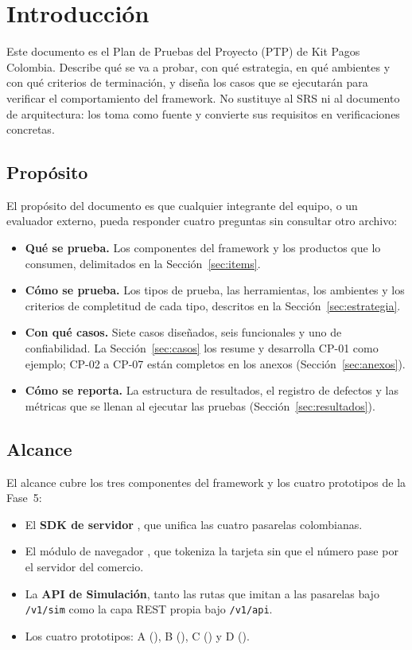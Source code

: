 \section{Introducción}

Este documento es el Plan de Pruebas del Proyecto (PTP) de Kit Pagos Colombia. Describe qué se va a probar, con qué estrategia, en qué ambientes y con qué criterios de terminación, y diseña los casos que se ejecutarán para verificar el comportamiento del framework. No sustituye al SRS ni al documento de arquitectura: los toma como fuente y convierte sus requisitos en verificaciones concretas.

\subsection{Propósito}

El propósito del documento es que cualquier integrante del equipo, o un evaluador externo, pueda responder cuatro preguntas sin consultar otro archivo:

\begin{itemize}
  \item \textbf{Qué se prueba.} Los componentes del framework y los productos que lo consumen, delimitados en la Sección~\ref{sec:items}.
  \item \textbf{Cómo se prueba.} Los tipos de prueba, las herramientas, los ambientes y los criterios de completitud de cada tipo, descritos en la Sección~\ref{sec:estrategia}.
  \item \textbf{Con qué casos.} Siete casos diseñados, seis funcionales y uno de confiabilidad. La Sección~\ref{sec:casos} los resume y desarrolla CP-01 como ejemplo; CP-02 a CP-07 están completos en los anexos (Sección~\ref{sec:anexos}).
  \item \textbf{Cómo se reporta.} La estructura de resultados, el registro de defectos y las métricas que se llenan al ejecutar las pruebas (Sección~\ref{sec:resultados}).
\end{itemize}

\subsection{Alcance}

El alcance cubre los tres componentes del framework y los cuatro prototipos de la Fase~5:

\begin{itemize}
  \item El \textbf{SDK de servidor} , que unifica las cuatro pasarelas colombianas.
  \item El módulo de navegador , que tokeniza la tarjeta sin que el número pase por el servidor del comercio.
  \item La \textbf{API de Simulación}, tanto las rutas que imitan a las pasarelas bajo \texttt{/v1/sim} como la capa REST propia bajo \texttt{/v1/api}.
  \item Los cuatro prototipos: A (), B (), C () y D ().
\end{itemize}


